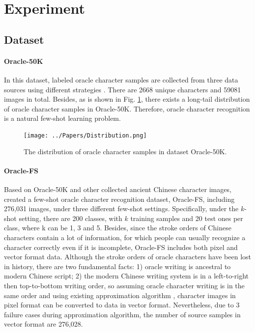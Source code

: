 \documentclass{article}
\begin{document}
\section{Experiment}

\subsection{Dataset}

\paragraph{Oracle-50K}
In this dataset, labeled oracle character samples are collected  from three data sources using different strategies \citep{Orc-BERT}. There are 2668 unique characters and 59081 images in total. Besides, as is shown in Fig. \ref{fig:distribution}, there exists a long-tail distribution of oracle character samples in Oracle-50K. Therefore, oracle character recognition is a natural few-shot learning problem.

\begin{figure}[h]
	\centering
	\texttt{[image: ../Papers/Distribution.png]}
	\caption{The distribution of oracle character samples in dataset Oracle-50K.}
	\label{fig:distribution}
\end{figure}

\paragraph{Oracle-FS}
Based on Oracle-50K and other collected ancient Chinese character images, \cite{Orc-BERT} created a few-shot oracle character recognition dataset, Oracle-FS, including 276,031 images, under three different few-shot settings. 
Specifically, under the $k$-shot setting, there are 200 classes, with $k$ training samples and 20 test ones per class, where k can be 1, 3 and 5.
Besides, since the stroke orders of Chinese characters contain a lot of information, for which people can usually recognize a character correctly even if it is incomplete, Oracle-FS includes both pixel and vector format data.
Although the stroke orders of oracle characters have been lost in history, there are two fundamental facts: 1) oracle writing is ancestral to modern Chinese script; 2) the modern Chinese writing system is in a left-to-right then top-to-bottom writing order, so assuming oracle character writing is in the same order and using existing approximation algorithm \citep{Handwriting}, character images in pixel format can be converted to data in vector format.  
Nevertheless, due to 3 failure cases during approximation algorithm, the number of source samples in vector format are 276,028.
\end{document}
